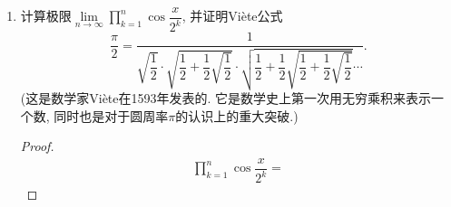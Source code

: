 \documentclass[a4paper,11pt,twoside]{ctexbook}
\begin{document}
\begin{enumerate}
	\item 计算极限$\lim\limits_{n\to\infty} \displaystyle\prod\limits_{k=1}^n \cos{\dfrac{x}{2^k}}$, 并证明Vi\`ete公式
	      \[
		      \dfrac{\pi}{2}=\dfrac{1}{ \sqrt{\dfrac{1}{2}} \cdot \sqrt{\dfrac{1}{2}+\dfrac{1}{2}\sqrt{\dfrac{1}{2}}} \cdot \sqrt{\dfrac{1}{2}+\dfrac{1}{2}\sqrt{\dfrac{1}{2}+\dfrac{1}{2}\sqrt{\dfrac{1}{2}}}}\cdots}.
	      \]
		(这是数学家Vi\`ete在1593年发表的. 它是数学史上第一次用无穷乘积来表示一个数, 同时也是对于圆周率$\pi$的认识上的重大突破.)
		\begin{proof}
			\[
				\begin{split}
				\prod\limits_{k=1}^n \cos{\dfrac{x}{2^k}}=
				\end{split}
			\]
		\end{proof}
\end{enumerate}

\ifx\all\undefined
\end{document}
